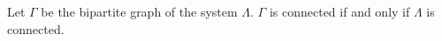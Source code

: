 Let $\Gamma$ be the bipartite graph of the system $\Lambda$. $\Gamma$ is connected if and only if $\Lambda$ is connected.
